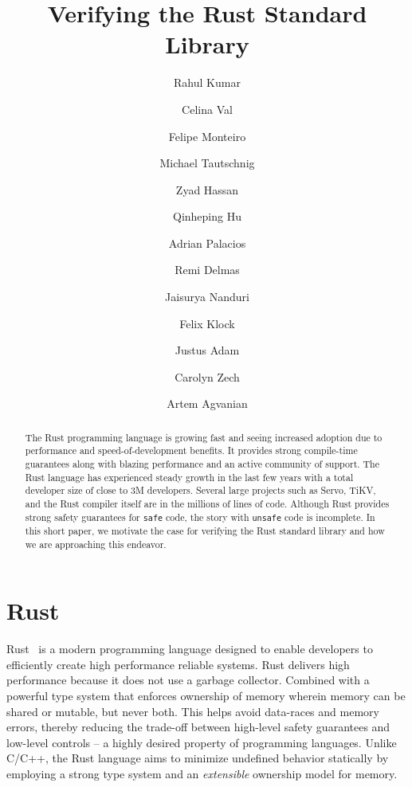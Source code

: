 \documentclass[runningheads]{llncs}
\begin{document}
%
\title{Verifying the Rust Standard Library}

\author{
Rahul Kumar \and 
Celina Val \and
Felipe Monteiro \and
Michael Tautschnig \and
Zyad Hassan \and
Qinheping Hu \and
Adrian Palacios \and
Remi Delmas \and
Jaisurya Nanduri \and
Felix Klock \and
Justus Adam \and
Carolyn Zech \and
Artem Agvanian
}
%


\maketitle

\begin{abstract}
The Rust programming language is growing fast and seeing increased adoption due to performance and speed-of-development benefits. It provides strong compile-time guarantees along with blazing performance and an active community of support. The Rust language has experienced steady growth in the last few years with a total developer size of close to 3M developers. Several large projects such as Servo, TiKV, and the Rust compiler itself are in the millions of lines of code. Although Rust provides strong safety guarantees for \texttt{safe} code, the story with \texttt{unsafe} code is incomplete. In this short paper, we motivate the case for verifying the Rust standard library and how we are approaching this endeavor.

\end{abstract}

\section{Rust}

Rust~\cite{matsakis2014rust} is a modern programming language designed to enable developers to efficiently create high performance reliable systems. Rust delivers high performance because it does not use a garbage collector. Combined with a powerful type system that enforces ownership of memory wherein memory can be shared or mutable, but never both. This helps avoid data-races and memory errors, thereby reducing the trade-off between high-level safety guarantees and low-level controls -- a highly desired property of programming languages. Unlike C/C++, the Rust language aims to minimize undefined behavior statically by employing a strong type system and an \textit{extensible} ownership model for memory. 
\end{document}
